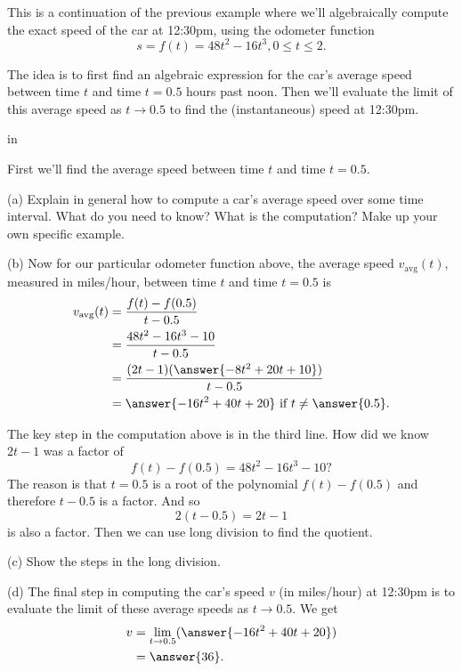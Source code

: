 \documentclass{ximera}
\newcommand{\pskip}{\vskip 0.1 in}
\begin{document}
\begin{example} \label{Exsdf4r55ytyh}
This is a continuation of the previous example where we'll algebraically compute the exact speed of the car at 12:30pm, using the odometer function
\[
     s = f(t) = 48t^2 - 16t^3, 0\leq t \leq 2.
\]

The idea is to first find an algebraic expression for the car's average speed between time $t$ and time $t=0.5$ hours past noon. Then we'll evaluate the limit of this average speed as $t\to 0.5$ to find the (instantaneous) speed at 12:30pm.

\pskip


\begin{question} \label{Q:43fggte}
First we'll find the average speed between time $t$ and time $t=0.5$. 

(a) Explain in general how to compute a car's average speed over some time interval. What do you need to know? What is the computation? Make up your own specific example.

(b) Now for our particular odometer function above, the average speed $v_{\text{avg}}(t)$, measured in miles/hour, between time $t$ and time $t=0.5$ is
\begin{align*}
   v_{\text{avg}}(t) &= \frac{f(t) - f(0.5)}{t - 0.5} \\
                        &= \frac{48t^2 - 16t^3 - 10 }{t-0.5} \\
                        &= \frac{(2t-1)(\answer{-8t^2 + 20t + 10})}{t-0.5} \\
                        & = \answer{-16t^2+40t + 20} \text{ if } t\neq \answer{0.5}.
\end{align*}

The key step in the computation above is in the third line. How did we know $2t-1$ was a factor of 
\[
   f(t) - f(0.5) = 48t^2 - 16t^3 - 10 ?
\]  
The reason is that $t=0.5$ is a root of the polynomial $f(t)-f(0.5)$ and therefore $t - 0.5$ is a factor. And so 
\[
   2(t-0.5) = 2t-1
\]
is also a factor. Then we can use long division to find the quotient.

(c) Show the steps in the long division.

(d) The final step in computing the car's speed $v$ (in miles/hour) at 12:30pm is to evaluate the limit of these average speeds as $t\to 0.5$. We get
\begin{align*}
    v &= \lim_{t\to 0.5} (\answer{-16t^2+40t + 20}) \\
       & = \answer{36} .
\end{align*}



\end{question}
\end{example}
\end{document}
